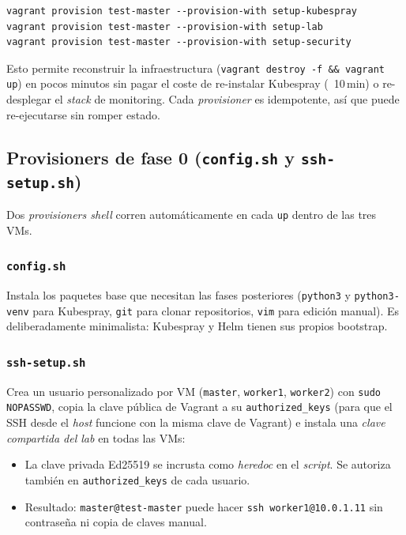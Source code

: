 \begin{lstlisting}[style=bash]
vagrant provision test-master --provision-with setup-kubespray
vagrant provision test-master --provision-with setup-lab
vagrant provision test-master --provision-with setup-security
\end{lstlisting}

Esto permite reconstruir la infraestructura (\texttt{vagrant destroy -f \&\& vagrant up}) en pocos minutos sin pagar el coste de re-instalar Kubespray (~10\,min) o re-desplegar el \emph{stack} de monitoring. Cada \emph{provisioner} es idempotente, así que puede re-ejecutarse sin romper estado.

\subsection{Provisioners de fase 0 (\texttt{config.sh} y \texttt{ssh-setup.sh})}

Dos \emph{provisioners shell} corren automáticamente en cada \texttt{up} dentro de las tres VMs.

\subsubsection{\texttt{config.sh}}

Instala los paquetes base que necesitan las fases posteriores (\texttt{python3} y \texttt{python3-venv} para Kubespray, \texttt{git} para clonar repositorios, \texttt{vim} para edición manual). Es deliberadamente minimalista: Kubespray y Helm tienen sus propios bootstrap.

\subsubsection{\texttt{ssh-setup.sh}}

Crea un usuario personalizado por VM (\texttt{master}, \texttt{worker1}, \texttt{worker2}) con \texttt{sudo NOPASSWD}, copia la clave pública de Vagrant a su \texttt{authorized\_keys} (para que el SSH desde el \emph{host} funcione con la misma clave de Vagrant) e instala una \emph{clave compartida del lab} en todas las VMs:

\begin{itemize}
  \item La clave privada Ed25519 se incrusta como \emph{heredoc} en el \emph{script}. Se autoriza también en \texttt{authorized\_keys} de cada usuario.
  \item Resultado: \texttt{master@test-master} puede hacer \texttt{ssh worker1@10.0.1.11} sin contraseña ni copia de claves manual.
\end{itemize}

